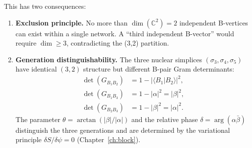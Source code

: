 This has two consequences:
\begin{enumerate}
\item \textbf{Exclusion principle.}  No more than $\dim(\mathbb{C}^2) = 2$ independent B-vertices can exist within a single network.  A ``third independent B-vector'' would require $\dim \geq 3$, contradicting the (3,2) partition.

\item \textbf{Generation distinguishability.}  The three nuclear simplices $(\sigma_3, \sigma_4, \sigma_5)$ have identical $(3,2)$ structure but different B-pair Gram determinants:
\begin{align}
\det(G_{B_1 B_2}) &= 1 - |\langle B_1 | B_2 \rangle|^2, \\
\det(G_{B_1 B_3}) &= 1 - |\alpha|^2 = |\beta|^2, \\
\det(G_{B_2 B_3}) &= 1 - |\beta|^2 = |\alpha|^2.
\end{align}
The parameter $\theta = \arctan(|\beta|/|\alpha|)$ and the relative phase $\delta = \arg(\alpha\bar\beta)$ distinguish the three generations and are determined by the variational principle $\delta S / \delta\psi = 0$ (Chapter~\ref{ch:block}).
\end{enumerate}
